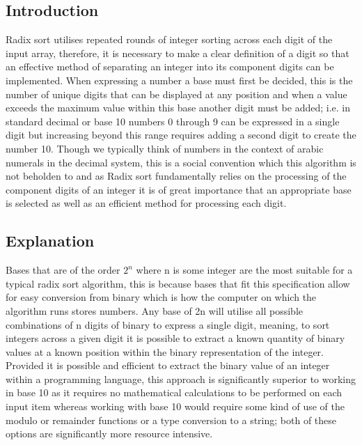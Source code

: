 \documentclass[12pt]{article}
\begin{document}
	\subsection{Introduction}
	Radix sort utilises repeated rounds of integer sorting across each digit of the input array, therefore, it is necessary to make a clear definition of a digit so that an effective method of separating an integer into its component digits can be implemented. When expressing a number a base must first be decided, this is the number of unique digits that can be displayed at any position and when a value exceeds the maximum value within this base another digit must be added; i.e. in standard decimal or base 10 numbers 0 through 9 can be expressed in a single digit but increasing beyond this range requires adding a second digit to create the number 10. Though we typically think of numbers in the context of arabic numerals in the decimal system, this is a social convention which this algorithm is not beholden to and as Radix sort fundamentally relies on the processing of the component digits of an integer it is of great importance that an appropriate base is selected as well as an efficient method for processing each digit.
	\subsection{Explanation}
	Bases that are of the order $2^n$ where n is some integer are the most suitable for a typical radix sort algorithm, this is because bases that fit this specification allow for easy conversion from binary which is how the computer on which the algorithm runs stores numbers. Any base of 2n will utilise all possible combinations of n digits of binary to express a single digit, meaning, to sort integers across a given digit it is possible to extract a known quantity of binary values at a known position within the binary representation of the integer. Provided it is possible and efficient to extract the binary value of an integer within a programming language, this approach is significantly superior to working in base 10 as it requires no mathematical calculations to be performed on each input item whereas working with base 10 would require some kind of use of the modulo or remainder functions or a type conversion to a string; both of these options are significantly more resource intensive.
\end{document}
